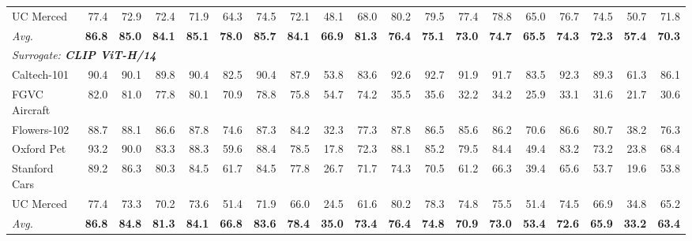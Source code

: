 \begin{table}[t]
{\begin{tabular}{l || r | rrrrrrr | r || r | rrrrrrr | r}
\hspace{4pt}UC Merced & 77.4 & 72.9 & 72.4 & 71.9 & 64.3 & 74.5 & 72.1 & 48.1 & 68.0 & 80.2 & 79.5 & 77.4 & 78.8 & 65.0 & 76.7 & 74.5 & 50.7 & 71.8 \\
\addlinespace[1pt]
\hspace{4pt}\textit{Avg.} & \textbf{86.8} & \textbf{85.0} & \textbf{84.1} & \textbf{85.1} & \textbf{78.0} & \textbf{85.7} & \textbf{84.1} & \textbf{66.9} & \textbf{81.3} & \textbf{76.4} & \textbf{75.1} & \textbf{73.0} & \textbf{74.7} & \textbf{65.5} & \textbf{74.3} & \textbf{72.3} & \textbf{57.4} & \textbf{70.3} \\
\midrule
\multicolumn{19}{l}{\textit{Surrogate: \textbf{CLIP ViT-H/14}}}  \\
\addlinespace[1pt]
\hspace{4pt}Caltech-101 & 90.4 & 90.1 & 89.8 & 90.4 & 82.5 & 90.4 & 87.9 & 53.8 & 83.6 & 92.6 & 92.7 & 91.9 & 91.7 & 83.5 & 92.3 & 89.3 & 61.3 & 86.1 \\
\hspace{4pt}FGVC Aircraft & 82.0 & 81.0 & 77.8 & 80.1 & 70.9 & 78.8 & 75.8 & 54.7 & 74.2 & 35.5 & 35.6 & 32.2 & 34.2 & 25.9 & 33.1 & 31.6 & 21.7 & 30.6 \\
\hspace{4pt}Flowers-102 & 88.7 & 88.1 & 86.6 & 87.8 & 74.6 & 87.3 & 84.2 & 32.3 & 77.3 & 87.8 & 86.5 & 85.6 & 86.2 & 70.6 & 86.6 & 80.7 & 38.2 & 76.3 \\
\hspace{4pt}Oxford Pet & 93.2 & 90.0 & 83.3 & 88.3 & 59.6 & 88.4 & 78.5 & 17.8 & 72.3 & 88.1 & 85.2 & 79.5 & 84.4 & 49.4 & 83.2 & 73.2 & 23.8 & 68.4 \\
\hspace{4pt}Stanford Cars & 89.2 & 86.3 & 80.3 & 84.5 & 61.7 & 84.5 & 77.8 & 26.7 & 71.7 & 74.3 & 70.5 & 61.2 & 66.3 & 39.4 & 65.6 & 53.7 & 19.6 & 53.8 \\
\hspace{4pt}UC Merced & 77.4 & 73.3 & 70.2 & 73.6 & 51.4 & 71.9 & 66.0 & 24.5 & 61.6 & 80.2 & 78.3 & 74.8 & 75.5 & 51.4 & 74.5 & 66.9 & 34.8 & 65.2 \\
\addlinespace[1pt]
\hspace{4pt}\textit{Avg.} & \textbf{86.8} & \textbf{84.8} & \textbf{81.3} & \textbf{84.1} & \textbf{66.8} & \textbf{83.6} & \textbf{78.4} & \textbf{35.0} & \textbf{73.4} & \textbf{76.4} & \textbf{74.8} & \textbf{70.9} & \textbf{73.0} & \textbf{53.4} & \textbf{72.6} & \textbf{65.9} & \textbf{33.2} & \textbf{63.4} \\
\midrule

\end{tabular}}
\end{table}
